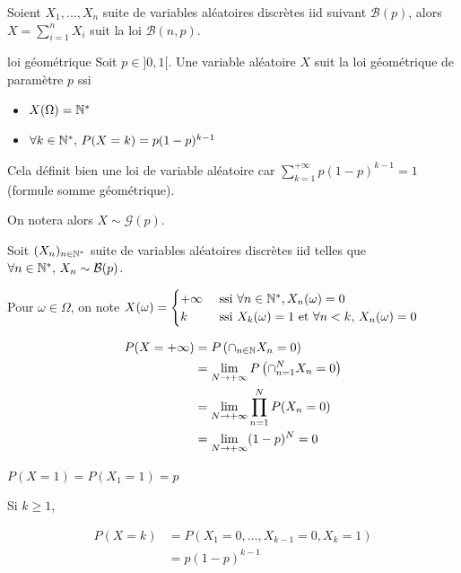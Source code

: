 \begin{remarque}
    Soient $X_1, \dots, X_n$ suite de variables aléatoires discrètes iid suivant $\mathcal B(p)$, 
    alors $\displaystyle X = \sum_{i = 1 }^{ n } X_i$ suit la loi $\mathcal B(n, p)$.
\end{remarque}

\begin{definition}{loi géométrique}{}
    Soit $p \in ]0, 1[$. Une variable aléatoire $X$ suit la loi géométrique de paramètre $p$ ssi 
    \begin{itemize}
        \item $X(\Omega) = \mathbb{N}^*$
        \item $\forall k \in \mathbb{N}^*, \, P(X = k) = p(1 - p)^{k - 1} $
    \end{itemize}

    Cela définit bien une loi de variable aléatoire car $\displaystyle \sum_{k = 1}^{+ \infty} p(1 - p)^{k - 1} = 1$
    (formule somme géométrique).

    On notera alors $X \sim \mathcal G(p)$.
\end{definition}


\svspace Soit $(X_n)_{n \in \mathbb{N}^*}$ suite de variables aléatoires discrètes iid telles que $\forall n \in \mathbb{N}^*, \, X_n \sim \mathcal B(p)$.

Pour $\omega \in \Omega$, on note $X(\omega) = \begin{cases}
    + \infty & \text{ ssi } \forall n \in \mathbb{N}^*, X_n(\omega) = 0 \\
    k & \text{ ssi } X_k(\omega) = 1 \text{ et } \forall n < k, \, X_n(\omega) = 0
\end{cases}$

\begin{align}
    \displaystyle P(X = + \infty) & = P\left( \cap_{n \in \mathbb{N}} X_n = 0 \right) \\
    & = \lim_{N \to + \infty} P\left( \cap_{n = 1}^N X_n = 0 \right) \\
    & = \lim_{N \to + \infty} \prod_{n = 1 }^{N } P(X_n = 0) \\
    & = \lim_{N \to + \infty} (1 - p)^N = 0
\end{align}

$P(X = 1) = P(X_1 = 1) = p$

Si $k \geqslant 1$, 

\begin{align}
    P(X = k) & = P\left( X_1 = 0, \dots, X_{k - 1} = 0, X_k = 1 \right) \\
    & = p (1 - p)^{k - 1}
\end{align}


